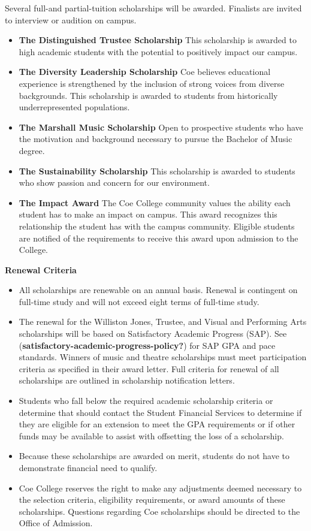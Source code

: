 \documentclass[
  letterpaper,
]{scrbook}
\providecommand{\tightlist}{%
  \setlength{\itemsep}{0pt}\setlength{\parskip}{0pt}}
\begin{document}
Several full-and partial-tuition scholarships will be awarded. Finalists
are invited to interview or audition on campus.

\begin{itemize}
\tightlist
\item
  \textbf{The Distinguished Trustee Scholarship} This scholarship is
  awarded to high academic students with the potential to positively
  impact our campus.
\item
  \textbf{The Diversity Leadership Scholarship} Coe believes educational
  experience is strengthened by the inclusion of strong voices from
  diverse backgrounds. This scholarship is awarded to students from
  historically underrepresented populations.
\item
  \textbf{The Marshall Music Scholarship} Open to prospective students
  who have the motivation and background necessary to pursue the
  Bachelor of Music degree.
\item
  \textbf{The Sustainability Scholarship} This scholarship is awarded to
  students who show passion and concern for our environment.
\item
  \textbf{The Impact Award} The Coe College community values the ability
  each student has to make an impact on campus. This award recognizes
  this relationship the student has with the campus community. Eligible
  students are notified of the requirements to receive this award upon
  admission to the College.
\end{itemize}

\textbf{Renewal Criteria}

\begin{itemize}
\tightlist
\item
  All scholarships are renewable on an annual basis. Renewal is
  contingent on full-time study and will not exceed eight terms of
  full-time study.
\item
  The renewal for the Williston Jones, Trustee, and Visual and
  Performing Arts scholarships will be based on Satisfactory Academic
  Progress (SAP). See (\textbf{satisfactory-academic-progress-policy?})
  for SAP GPA and pace standards. Winners of music and theatre
  scholarships must meet participation criteria as specified in their
  award letter. Full criteria for renewal of all scholarships are
  outlined in scholarship notification letters.
\item
  Students who fall below the required academic scholarship criteria or
  determine that should contact the Student Financial Services to
  determine if they are eligible for an extension to meet the GPA
  requirements or if other funds may be available to assist with
  offsetting the loss of a scholarship.
\item
  Because these scholarships are awarded on merit, students do not have
  to demonstrate financial need to qualify.
\item
  Coe College reserves the right to make any adjustments deemed
  necessary to the selection criteria, eligibility requirements, or
  award amounts of these scholarships. Questions regarding Coe
  scholarships should be directed to the Office of Admission.
\end{itemize}
\end{document}
